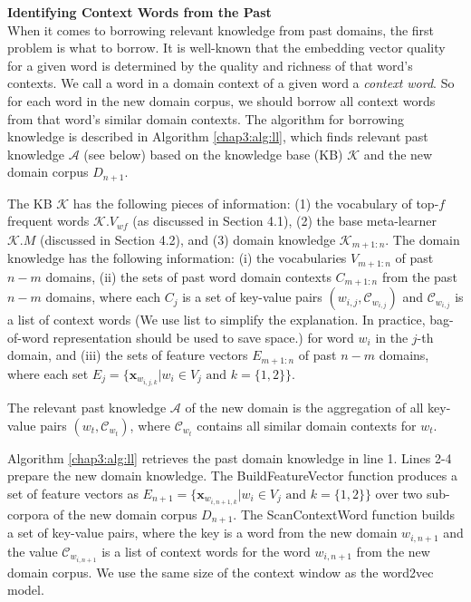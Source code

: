 \textbf{Identifying Context Words from the Past}\\
When it comes to borrowing relevant knowledge from past domains, the first problem is what to borrow.
It is well-known that the embedding vector quality for a given word is determined by the quality and richness of that word's contexts.
We call a word in a domain context of a given word a \emph{context word}.
So for each word in the new domain corpus, we should borrow all context words from that word's similar domain contexts.
The algorithm for borrowing knowledge is described in Algorithm \ref{chap3:alg:ll}, which finds relevant past knowledge $\mathcal{A}$ (see below) based on the
knowledge base (KB) $\mathcal{K}$ and the new domain corpus $D_{n+1}$.

The KB $\mathcal{K}$ has the following pieces of information:
(1) the vocabulary of top-$f$ frequent words $\mathcal{K}.V_{\textit{wf}}$ (as discussed in Section 4.1), 
(2) the base meta-learner $\mathcal{K}.M$ (discussed in Section 4.2),
and (3) domain knowledge $\mathcal{K}_{m+1:n}$.
The domain knowledge has the following information:
(i) the vocabularies $V_{m+1:n}$ of past $n-m$ domains,
(ii) the sets of past word domain contexts $C_{m+1:n}$ from the past $n-m$ domains, where each $C_j$ is a set of key-value pairs $(w_{i,j}, \mathcal{C}_{w_{i,j} } )$ and $\mathcal{C}_{w_{i,j} } $ is a list of context words (We use list to simplify the explanation. In practice, bag-of-word representation should be used to save space.) for word $w_i$ in the $j$-th domain, 
and (iii) the sets of feature vectors $E_{m+1:n}$ of past $n-m$ domains, where each set $E_{j}=\{ \mathbf{x}_{w_{i, j, k}} | w_i \in V_{j} \text{ and } k=\{1, 2\} \}$.

The relevant past knowledge $\mathcal{A}$ of the new domain is the aggregation of all key-value pairs $(w_t, \mathcal{C}_{w_t})$, where $\mathcal{C}_{w_t}$ contains all similar domain contexts for $w_t$.

Algorithm \ref{chap3:alg:ll} retrieves the past domain knowledge in line 1.
Lines 2-4 prepare the new domain knowledge.
The BuildFeatureVector function produces a set of feature vectors as $E_{n+1}=\{ \mathbf{x}_{w_{i, n+1, k}} | w_i \in V_{j} \text{ and } k=\{1, 2\}\}$ over two sub-corpora of the new domain corpus $D_{n+1}$.
The ScanContextWord function builds a set of key-value pairs, where the key is a word from the new domain $w_{i, n+1}$ and the value $\mathcal{C}_{w_{i,n+1} } $ is a list of context words for the word $w_{i, n+1}$ from the new domain corpus. We use the same size of the context window as the word2vec model.

